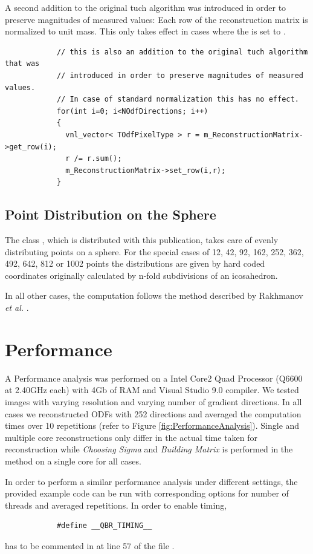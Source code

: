 \documentclass{InsightArticle}
\begin{document}
A second addition to the original tuch algorithm was
introduced in order to preserve magnitudes of measured values: Each row of the reconstruction matrix is normalized to unit mass. This only takes effect in cases where the  is set to . 

\small
\begin{verbatim}
			// this is also an addition to the original tuch algorithm that was
			// introduced in order to preserve magnitudes of measured values.
			// In case of standard normalization this has no effect. 
			for(int i=0; i<NOdfDirections; i++)
			{
			  vnl_vector< TOdfPixelType > r = m_ReconstructionMatrix->get_row(i);
			  r /= r.sum();
			  m_ReconstructionMatrix->set_row(i,r);
			}
\end{verbatim}
\normalsize

\subsection{Point Distribution on the Sphere}
The class , which is distributed with this publication, takes care of evenly distributing points on a sphere. For the special cases of 12, 42, 92, 162, 252, 362, 492, 642, 812 or 1002 points the distributions are given by hard coded coordinates originally calculated by n-fold subdivisions of an icosahedron. 

In all other cases, the computation follows the method described by Rakhmanov \textit{et al.} \cite{Rakhmanov1994}.

\section{Performance}
A Performance analysis was performed on a Intel Core2 Quad Processor (Q6600 at 2.40GHz each) with 4Gb of RAM and Visual Studio 9.0 compiler. We tested images with varying resolution and varying number of gradient directions. In all cases we reconstructed ODFs with 252 directions and averaged the computation times over 10 repetitions (refer to Figure \ref{fig:PerformanceAnalysis}). Single and multiple core reconstructions only differ in the actual time taken for reconstruction while \textit{Choosing Sigma} and \textit{Building Matrix} is performed in the  method on a single core for all cases.

In order to perform a similar performance analysis under different settings, the provided example code can be run with corresponding options for number of threads and averaged repetitions. In order to enable timing,
\small
\begin{verbatim}
			#define __QBR_TIMING__
\end{verbatim}
\normalsize
has to be commented in at line 57 of the file .
\end{document}
